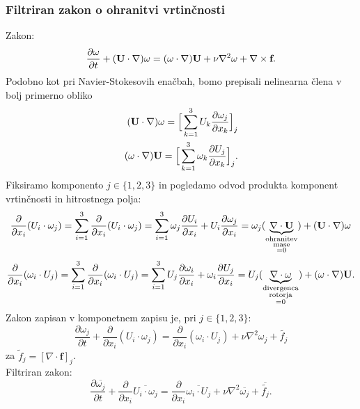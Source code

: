 \documentclass[mat2, tisk]{fmfdelo}
\newcommand{\bd}{\textbf}
\begin{document}
\subsubsection{Filtriran zakon o ohranitvi vrtinčnosti}

Zakon:
$$
\frac{\partial \text{\bd{$\omega$}}}{\partial t} + (\bd{U}\cdot \nabla)\text{\bd{$\omega$}} = (\text{\bd{$\omega$}} \cdot \nabla)\bd{U} + \nu \nabla^2 \text{\bd{$\omega$}} + \nabla \times \bd{f}. 
$$
Podobno kot pri Navier-Stokesovih enačbah, bomo prepisali nelinearna člena v bolj primerno 
obliko
\begin{align*}
(\bd{U} \cdot \nabla) \text{\bd{$\omega$}} = \Big[\sum_{k=1}^3 U_k \frac{\partial \omega_j}{\partial x_k}\Big]_j\\
(\text{\bd{$\omega$}} \cdot \nabla) \bd{U} = \Big[\sum_{k=1}^3 \omega_k \frac{\partial U_j}{\partial x_k}\Big]_j.
\end{align*}
Fiksiramo komponento $j\in\{1, 2, 3\}$ in pogledamo odvod produkta komponent vrtinčnosti in hitrostnega polja:
\begin{align*}
\frac{\partial}{\partial x_i} (U_i \cdot\omega_j) = \sum_{i=1}^3 \frac{\partial}{\partial x_i} (U_i \cdot\omega_j) = 
\sum_{i=1}^3 \omega_j\frac{\partial U_i}{\partial x_i} + U_i\frac{\partial \omega_j}{\partial x_i} = 
\omega_j (\underbrace{\nabla \cdot \bd{U}}_{\substack{\text{ohranitev}\\\text{mase}\\=0}}) + (\bd{U}\cdot\nabla)\text{\bd{$\omega$}}
\end{align*}
\begin{align*}
\frac{\partial}{\partial x_i} (\omega_i \cdot U_j) = \sum_{i=1}^3 \frac{\partial}{\partial x_i} (\omega_i \cdot U_j) = 
\sum_{i=1}^3 U_j\frac{\partial \omega_i}{\partial x_i} + \omega_i\frac{\partial U_j}{\partial x_i} = 
U_j (\underbrace{\nabla \cdot \text{\bd{$\omega$}}}_{\substack{\text{divergenca}\\\text{rotorja}\\=0}}) + (\text{\bd{$\omega$}}\cdot\nabla)\text{\bd{U}}.
\end{align*}
Zakon zapisan v komponetnem zapisu je, pri $j\in \{1, 2, 3\}$:
\begin{equation}
\frac{\partial \omega_j}{\partial t} + \frac{\partial}{\partial x_i} (U_i \cdot \omega_j) = 
\frac{\partial}{\partial x_i} (\omega_i \cdot U_j) + \nu \nabla^2 \omega_j + \tilde{f_j}
\end{equation}
za $\tilde{f}_j = [\nabla \cdot \bd{f}]_j$.\\
Filtriran zakon:
\begin{equation}
  \frac{\partial \overline{\omega_j}}{\partial t} + \frac{\partial}{\partial x_i} \overline{U_i \cdot \omega_j} = 
  \frac{\partial}{\partial x_i} \overline{\omega_i \cdot U_j} + \nu \nabla^2 \overline{\omega_j} + \overline{\tilde{f_j}}.
\end{equation}
\end{document}
